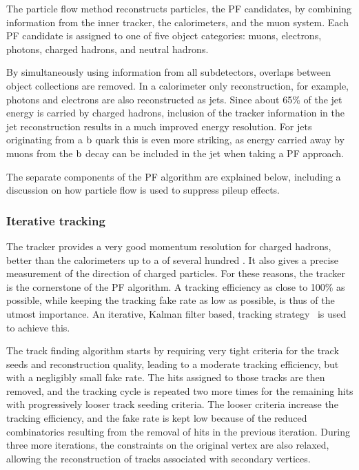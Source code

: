 The particle flow method reconstructs particles, the PF candidates, by combining information from
the inner tracker, the calorimeters, and the muon system.  Each PF candidate is assigned to one of
five object categories: muons, electrons, photons, charged hadrons, and neutral hadrons.  

By simultaneously using information from all subdetectors, overlaps between object collections are
removed. In a calorimeter only reconstruction, for example, photons and electrons are also
reconstructed as jets. 
Since about 65\% of the jet energy is carried by charged hadrons, inclusion of the tracker
information in the jet reconstruction results in a much improved energy resolution. For jets
originating from a $\mathrm{b}$ quark this is even more striking, as energy carried away by muons from
the $\mathrm{b}$ decay can be included in the jet when taking a PF approach. 

The separate components of the PF algorithm are explained below, including a discussion on how
particle flow is used to suppress pileup effects.


\subsubsection{Iterative tracking}

The tracker provides a very good momentum resolution for charged hadrons, better than the
calorimeters up to a \pt of several hundred \GeV. It also gives a precise measurement of the
direction of charged particles. For these reasons, the tracker is the cornerstone of the PF
algorithm. A tracking efficiency as close to 100\% as possible, while keeping the tracking fake rate
as low as possible, is thus of the utmost importance.
An iterative, Kalman filter based, tracking strategy~\cite{Chatrchyan:2014fea} is used to achieve
this.

The track finding algorithm starts by requiring very tight criteria for the track seeds and
reconstruction quality, leading to a moderate tracking efficiency, but with a negligibly small fake
rate. 
The hits assigned to those tracks are then removed, and the tracking cycle is repeated two more
times for the remaining hits with progressively looser track seeding criteria. The looser criteria
increase the tracking efficiency, and the fake rate is kept low because of the reduced combinatorics
resulting from the removal of hits in the previous iteration. 
During three more iterations, the constraints on the original vertex are also relaxed, allowing
the reconstruction of tracks associated with secondary vertices. 


